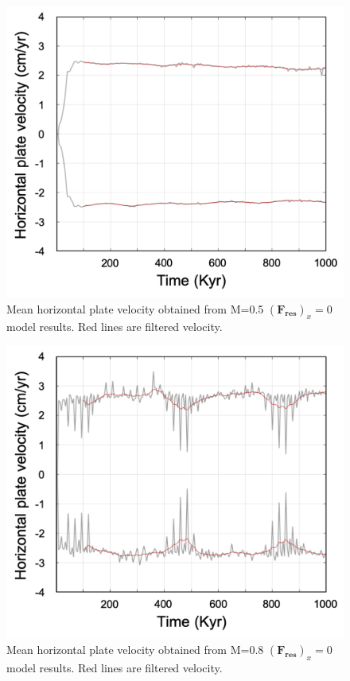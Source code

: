 \documentclass[letterpaper,12pt,notitle]{memphisthesis}                     %
\begin{document}
\begin{figure}[!htb]
	\centering
	\includegraphics[width=0.9\linewidth]{./figs/hmvf005.png}
	\caption{Mean horizontal plate velocity obtained from M=0.5 $(\boldsymbol{F_{res}})_x=0$ model results. Red lines are filtered velocity.}
	\label{fig:f0m05}
\end{figure}
\begin{figure}[!htb]
	\centering
	\includegraphics[width=0.9\linewidth]{./figs/hmvf008.png}
	\caption{Mean horizontal plate velocity obtained from M=0.8 $(\boldsymbol{F_{res}})_x=0$ model results. Red lines are filtered velocity.}
	\label{fig:f0m08}
\end{figure}
\end{document}
